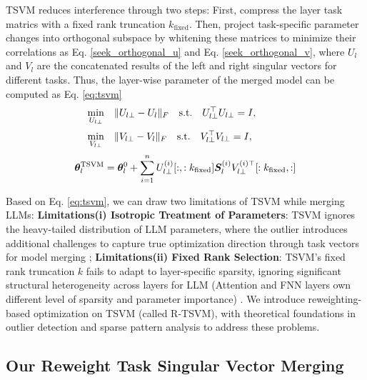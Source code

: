 TSVM reduces interference through two steps: First, compress the layer task matrics with a fixed rank truncation $k_{\text{fixed}}$. Then, project task-specific parameter changes into orthogonal subspace by whitening these matrices to minimize their correlations as Eq. \ref{seek_orthogonal_u} and Eq. \ref{seek_orthogonal_v}, where $U_{l}$ and $V_{l}$ are the concatenated results of the left and right singular
vectors for different tasks. Thus, the layer-wise parameter of the merged model can be computed as Eq. \ref{eq:tsvm}
\vspace{-0.3cm}
\begin{align}
    \label{seek_orthogonal_u}
    \min_{U_{l\bot}} & \quad \| U_{l\bot} - U_{l} \|_F 
        \quad \text{s.t.} \quad U_{l\bot}^\top U_{l\bot} = I, \\[0.5ex] %
    \label{seek_orthogonal_v}
    \min_{V_{l\bot}} & \quad \| V_{l\bot} - V_{l} \|_F 
        \quad \text{s.t.} \quad V_{l\bot}^\top V_{l\bot} = I, \\[0.5ex] %
    \label{eq:tsvm}
    \bm{\theta}_{l}^{\text{TSVM}} & = \bm{\theta}^{0}_{l} + 
        \sum_{\mathclap{i=1}}^n U_{l\bot}^{(i)}[:,:k_{\text{fixed}}] \bm{S}^{(i)}_l V_{l\bot}^{(i)\top}[:k_{\text{fixed}},:]
\end{align}

\vspace{-0.3cm}


Based on Eq. \ref{eq:tsvm}, we can draw two limitations of TSVM while merging LLMs: \textbf{Limitations(i) Isotropic Treatment of Parameters}: TSVM ignores the heavy-tailed distribution of LLM parameters, where the outlier introduces additional challenges to capture true optimization direction through task vectors for model merging \cite{li2024owlore}; \textbf{Limitations(ii) Fixed Rank Selection}: TSVM's fixed rank truncation $k$ fails to adapt to layer-specific sparsity, ignoring significant structural heterogeneity across layers for LLM (Attention and FNN layers own different level of sparsity and parameter importance) \cite{li2024discovering}. We introduce reweighting-based optimization on TSVM (called R-TSVM), with theoretical foundations in outlier detection and sparse pattern analysis to address these problems.


\subsection{Our Reweight Task Singular Vector Merging}



